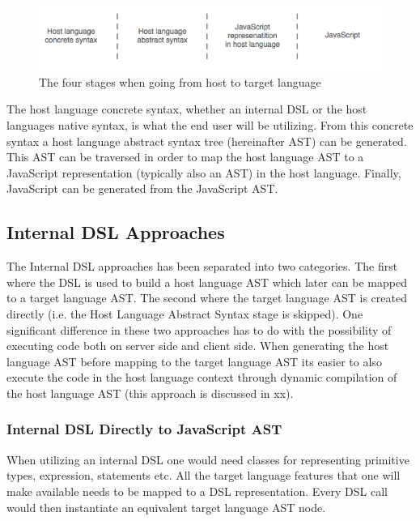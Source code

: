 		\begin{figure}
			\begin{center}
				\centerline{\includegraphics[width=14cm]{resources/images/stages.png}}
			\end{center}
			\caption{The four stages when going from host to target language}
			\label{compilationStages}
		\end{figure}
		
		The host language concrete syntax, whether an internal DSL or the host languages native syntax, is what the end user will be utilizing. From this concrete syntax a host language abstract syntax tree (hereinafter AST) can be generated. This AST can be traversed in order to map the host language AST to a JavaScript representation (typically also an AST) in the host language. Finally, JavaScript can be generated from the JavaScript AST.
	
	\subsection{Internal DSL Approaches}
		The Internal DSL approaches has been separated into two categories. The first where the DSL is used to build a host language AST which later can be mapped to a target language AST. The second where the target language AST is created directly (i.e. the Host Language Abstract Syntax stage is skipped). One significant difference in these two approaches has to do with the possibility of executing code both on server side and client side. When generating the host language AST before mapping to the target language AST its easier to also execute the code in the host language context through dynamic compilation of the host language AST (this approach is discussed in xx).

		\subsubsection{Internal DSL Directly to JavaScript AST}
			When utilizing an internal DSL one would need classes for representing primitive types, expression, statements etc. All the target language features that one will make available needs to be mapped to a DSL representation. Every DSL call would then instantiate an equivalent target language AST node.

